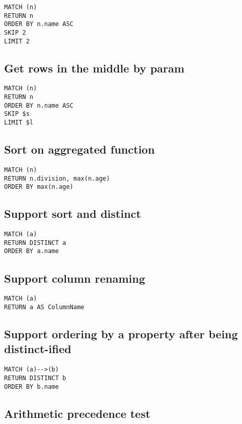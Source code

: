 \begin{lstlisting}
MATCH (n)
RETURN n
ORDER BY n.name ASC
SKIP 2
LIMIT 2
\end{lstlisting}

\subsection{Get rows in the middle by param}

\begin{lstlisting}
MATCH (n)
RETURN n
ORDER BY n.name ASC
SKIP $s
LIMIT $l
\end{lstlisting}

\subsection{Sort on aggregated function}

\begin{lstlisting}
MATCH (n)
RETURN n.division, max(n.age)
ORDER BY max(n.age)
\end{lstlisting}

\subsection{Support sort and distinct}

\begin{lstlisting}
MATCH (a)
RETURN DISTINCT a
ORDER BY a.name
\end{lstlisting}

\subsection{Support column renaming}

\begin{lstlisting}
MATCH (a)
RETURN a AS ColumnName
\end{lstlisting}

\subsection{Support ordering by a property after being distinct-ified}

\begin{lstlisting}
MATCH (a)-->(b)
RETURN DISTINCT b
ORDER BY b.name
\end{lstlisting}

\subsection{Arithmetic precedence test}

